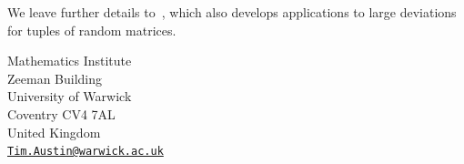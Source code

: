\documentclass[12pt,a4paper]{article}
\numberwithin{equation}{section}
\theoremstyle{remark}
\begin{document}
We leave further details to~\cite{APE4b}, which also develops applications to large deviations for tuples of random matrices.

















































{}



\begin{small}
\noindent Mathematics Institute\\ Zeeman Building\\ University of Warwick\\ Coventry CV4 7AL\\ United Kingdom\\ \href{mailto:Tim.Austin@warwick.ac.uk}{\texttt{Tim.Austin@warwick.ac.uk}}
\end{small}
\end{document}

